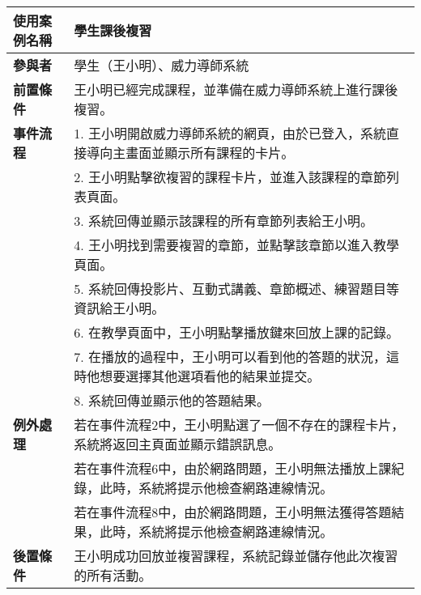 \documentclass[12pt]{article}
\begin{document}
\begin{table}[H]
  \centering
  \begin{tabular}{|l|p{14cm}|}
  \hline
  \textbf{使用案例名稱} & 學生課後複習 \\ 
  \hline
  \textbf{參與者} & 學生（王小明）、威力導師系統 \\ 
  \hline
  \textbf{前置條件} & 王小明已經完成課程，並準備在威力導師系統上進行課後複習。 \\ 
  \hline
  \textbf{事件流程} 
  & 1. 王小明開啟威力導師系統的網頁，由於已登入，系統直接導向主畫面並顯示所有課程的卡片。 \\
  & 2. 王小明點擊欲複習的課程卡片，並進入該課程的章節列表頁面。 \\
  & 3. 系統回傳並顯示該課程的所有章節列表給王小明。 \\
  & 4. 王小明找到需要複習的章節，並點擊該章節以進入教學頁面。 \\
  & 5. 系統回傳投影片、互動式講義、章節概述、練習題目等資訊給王小明。 \\
  & 6. 在教學頁面中，王小明點擊播放鍵來回放上課的記錄。 \\
  & 7. 在播放的過程中，王小明可以看到他的答題的狀況，這時他想要選擇其他選項看他的結果並提交。 \\
  & 8. 系統回傳並顯示他的答題結果。 \\
  \hline
  \textbf{例外處理} 
  & 若在事件流程2中，王小明點選了一個不存在的課程卡片，系統將返回主頁面並顯示錯誤訊息。 \\
  & 若在事件流程6中，由於網路問題，王小明無法播放上課紀錄，此時，系統將提示他檢查網路連線情況。 \\
  & 若在事件流程8中，由於網路問題，王小明無法獲得答題結果，此時，系統將提示他檢查網路連線情況。 \\
  \hline
  \textbf{後置條件} 
  & 王小明成功回放並複習課程，系統記錄並儲存他此次複習的所有活動。 \\
  \hline
  \end{tabular}
\end{table}
  
\end{document}
